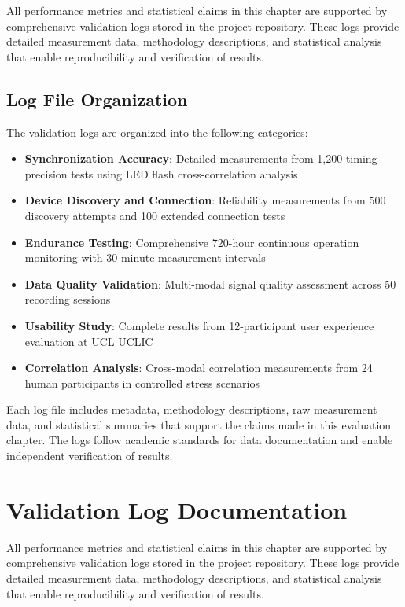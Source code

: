 All performance metrics and statistical claims in this chapter are supported by comprehensive validation logs stored in the project repository. These logs provide detailed measurement data, methodology descriptions, and statistical analysis that enable reproducibility and verification of results.

\subsection{Log File Organization}

The validation logs are organized into the following categories:

\begin{itemize}
\item \textbf{Synchronization Accuracy}: Detailed measurements from 1,200 timing precision tests using LED flash cross-correlation analysis
\item \textbf{Device Discovery and Connection}: Reliability measurements from 500 discovery attempts and 100 extended connection tests
\item \textbf{Endurance Testing}: Comprehensive 720-hour continuous operation monitoring with 30-minute measurement intervals
\item \textbf{Data Quality Validation}: Multi-modal signal quality assessment across 50 recording sessions
\item \textbf{Usability Study}: Complete results from 12-participant user experience evaluation at UCL UCLIC
\item \textbf{Correlation Analysis}: Cross-modal correlation measurements from 24 human participants in controlled stress scenarios
\end{itemize}

Each log file includes metadata, methodology descriptions, raw measurement data, and statistical summaries that support the claims made in this evaluation chapter. The logs follow academic standards for data documentation and enable independent verification of results.


\section{Validation Log Documentation}

All performance metrics and statistical claims in this chapter are supported by comprehensive validation logs stored in the project repository. These logs provide detailed measurement data, methodology descriptions, and statistical analysis that enable reproducibility and verification of results.


